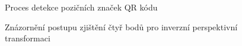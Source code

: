\begin{figure}[H]
  \begin{center}
    \caption{Proces detekce pozičních značek QR kódu}
    \label{QRCodeDetectionProcess}
  \end{center}
\end{figure}

\begin{figure}[H]
  \begin{center}
    \caption{Znázornění postupu zjištění čtyř bodů pro inverzní perspektivní
    transformaci}
    \label{QRCodeArea}
  \end{center}
\end{figure}

